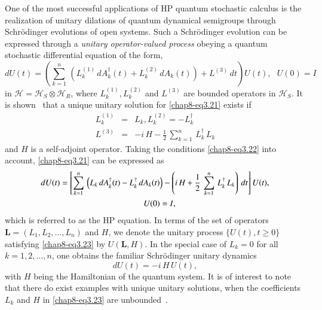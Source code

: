 One of the most successful applications of  HP quantum stochastic calculus is the realization of unitary dilations of quantum dynamical semigroups through Schr{\"o}dinger evolutions of open systems. Such a Schr{\"o}dinger evolution can be expressed through a {\it unitary operator-valued process} obeying a quantum stochastic differential equation of the form,
\begin{equation}
dU(t) =\left(\sum_{k=1}^n\, \left(L^{(1)}_k\, dA^\dag_k(t) +
L^{(2)}_k\, dA_k(t) \right) + L^{(3)}\, dt \right)\! U(t),\ \ \ U(0)=I \label{chap8-eq3.21}  
\end{equation} 
in  $\mathcal{H}=\mathcal{H}_S\otimes \mathcal{H}_R$, where  $L^{(1)}_k, L^{(2)}_k$ and  $L^{(3)}$  are bounded operators in $\mathcal{H}_S$. It is shown~\cite{chap8-key7} that a unique unitary solution for \eqref{chap8-eq3.21} exists if  
\begin{eqnarray}
L^{(1)}_k&=&L_k, L^{(2)}_k=-L^\dag_k\nonumber \\
L^{(3)}&=&-i\, H - \frac{1}{2}\, \sum_{k=1}^n\, L_k^\dag\, L_k \label{chap8-eq3.22}  
\end{eqnarray}
and $H$ is a self-adjoint operator.  Taking the conditions \eqref{chap8-eq3.22} into account, \eqref{chap8-eq3.21} can be expressed as~\cite{chap8-key7, chap8-key8}  
\begin{align}
dU(t) &=\left[\sum_{k=1}^n\, \left(L_k\, dA^\dag_k(t) -L^\dag_k\, dA_k(t)\right) -\left(i\, H+ \frac{1}{2}\, \sum_{k=1}^n\, L_k^\dag\, L_k \right) \, dt \right] U(t),\notag \\ 
& \qquad \qquad \qquad \qquad \qquad U(0)=I, \label{chap8-eq3.23}
\end{align}
which is referred to as the HP equation. In terms of the set of operators $\mathbf{L}=(L_1,L_2,\ldots, L_n)$ and $H$, we denote the unitary process $\{U(t), t\geq 0\}$ satisfying \eqref{chap8-eq3.23} by  $U\! (\mathbf{L}, H)$. In the special case of $L_k=0$ for all $k=1,2,\ldots, n$, one obtains the familiar Schr{\"o}dinger unitary dynamics 
\begin{equation}
dU(t)=-i\, H\, U(t), \label{chap8-eq3.24}  
\end{equation}
with $H$ being the Hamiltonian of the quantum system.    It is of interest to note that there do exist examples with unique unitary solutions, when the coefficients $L_k$ and $H$ in \eqref{chap8-eq3.23} are unbounded~\cite{chap8-key3,chap8-key4,chap8-key5,chap8-key6}. 

